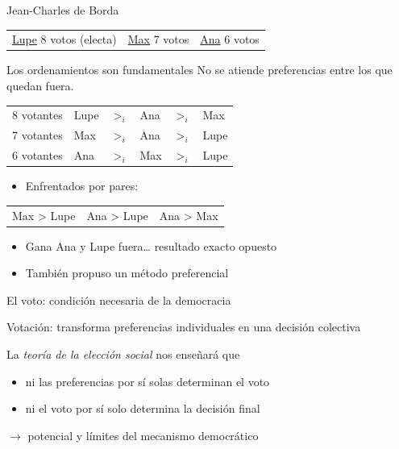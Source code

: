 \documentclass[bigger]{beamer}
\begin{document}
\begin{frame}[label={sec:orgcf63f7d}]{Jean-Charles de Borda}
\begin{center}
\begin{tabular}{lll}
\uline{Lupe} 8 votos (electa) & \uline{Max} 7 votos & \uline{Ana} 6 votos\\[0pt]
\end{tabular}
\end{center}

\pause

\begin{block}{Los ordenamientos son fundamentales}
No se atiende preferencias entre los que quedan fuera. 
\begin{center}
\begin{tabular}{llllll}
8 votantes & Lupe & \(>_i\) & Ana & \(>_i\) & Max\\[0pt]
7 votantes & Max & \(>_i\) & Ana & \(>_i\) & Lupe\\[0pt]
6 votantes & Ana & \(>_i\) & Max & \(>_i\) & Lupe\\[0pt]
\end{tabular}
\end{center}
\end{block}

\bigskip \pause
\begin{itemize}
\item Enfrentados por pares:
\end{itemize}
\begin{center}
\begin{tabular}{lll}
Max > Lupe & Ana > Lupe & Ana > Max\\[0pt]
\end{tabular}
\end{center}
\begin{itemize}
\item Gana Ana y Lupe fuera\ldots{} resultado exacto opuesto
\item También propuso un método preferencial
\end{itemize}
\end{frame}
\begin{frame}[label={sec:org186a94c}]{El voto: condición necesaria de la democracia}
\begin{block}{Votación:}
\centering
transforma \alert{preferencias individuales} en una \alert{decisión colectiva}
\end{block}

\bigskip \pause
La \emph{teoría de la elección social} nos enseñará que
\begin{itemize}
\item ni las preferencias por sí solas determinan el voto
\item ni el voto por sí solo determina la decisión final
\end{itemize}

\bigskip \pause
\(\rightarrow\) potencial y límites del \alert{mecanismo} democrático
\end{frame}
\end{document}
